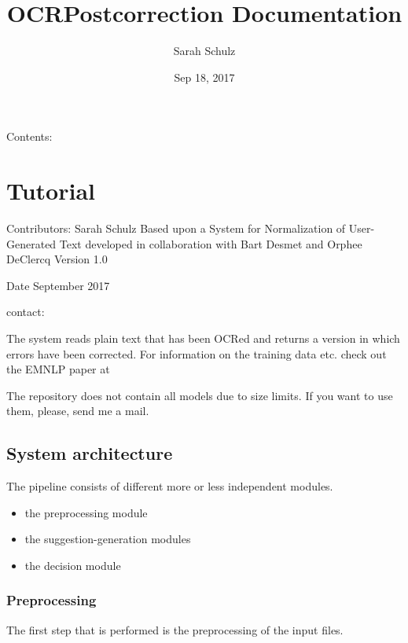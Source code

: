 \documentclass[letterpaper,10pt,english]{sphinxmanual}
\title{OCRPostcorrection Documentation}
\date{Sep 18, 2017}
\author{Sarah Schulz}
\begin{document}
\maketitle
\sphinxtableofcontents
{}\label{\detokenize{index::doc}}


Contents:


\chapter{Tutorial}
\label{\detokenize{README:welcome-to-nougat-s-documentation}}\label{\detokenize{README:tutorial}}\label{\detokenize{README::doc}}
Contributors: Sarah Schulz
Based upon a System for Normalization of User-Generated Text developed in collaboration with Bart Desmet and Orphee DeClercq
Version 1.0

Date September 2017

contact: 

The system reads plain text that has been OCRed and returns a version in which errors have been corrected.
For information on the training data etc. check out the EMNLP paper at 

The repository does not contain all models due to size limits. If you want to use them, please, send me a mail.


\section{System architecture}
\label{\detokenize{README:system-architecture}}
The pipeline consists of different more or less independent modules.
\begin{itemize}
\item {} 
the preprocessing module

\item {} 
the suggestion-generation modules

\item {} 
the decision module

\end{itemize}


\subsection{Preprocessing}
\label{\detokenize{README:preprocessing}}
The first step that is performed is the preprocessing of the input files.
\end{document}
